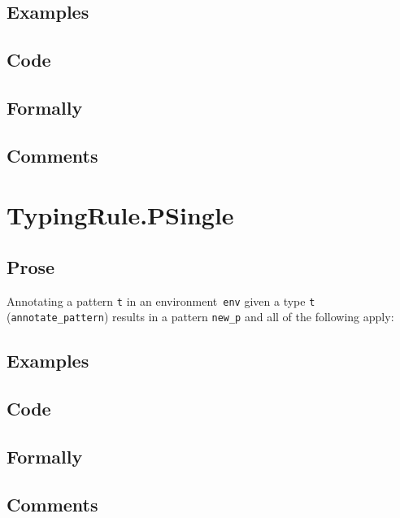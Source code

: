 \documentclass{book}
\begin{document}
  \subsection{Examples}

  \subsection{Code}

  \subsection{Formally}

  \subsection{Comments}
 
\section{TypingRule.PSingle \label{sec:TypingRule.PSingle}}

    \subsection{Prose}
Annotating a pattern \texttt{t} in an environment~\texttt{env} given a type \texttt{t} (\texttt{annotate\_pattern}) results in a pattern \texttt{new\_p} and all of the following apply:

  \subsection{Examples}

  \subsection{Code}

  \subsection{Formally}

  \subsection{Comments}
\end{document}
